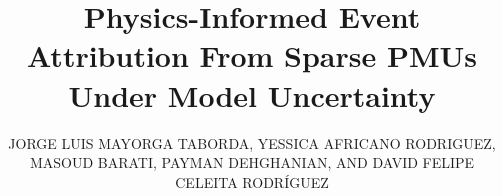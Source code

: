 \history{}
\doi{}

\title{Physics-Informed Event Attribution From Sparse PMUs Under Model Uncertainty}
\author{\uppercase{Jorge Luis Mayorga Taborda}, \uppercase{Yessica Africano Rodriguez}, \uppercase{Masoud Barati}, \uppercase{Payman Dehghanian}, AND \uppercase{David Felipe Celeita Rodr\'iguez}}

\address[1]{Universidad de los Andes, Bogot\'a, Colombia}
\address[2]{Department of Electrical and Computer Engineering, University of Pittsburgh, Pittsburgh, PA, USA}
\address[3]{Department of Electrical and Computer Engineering, The George Washington University, Washington, DC, USA}
\address[4]{Faculty of Engineering, Universidad de La Sabana, Ch\'ia, Colombia}

